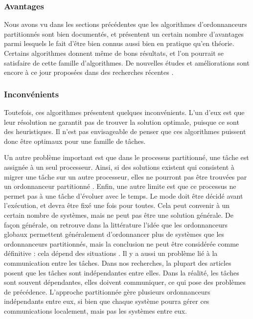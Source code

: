 \documentclass[11pt,a4paper,oneside]{report}
\begin{document}
\subsubsection{Avantages}
Nous avons vu dans les sections précédentes que les algorithmes d'ordonnanceurs 
partitionnés sont bien documentés, et présentent un certain nombre d'avantages parmi lesquels 
le fait d'être bien connus aussi bien en pratique qu'en théorie. 
Certains algorithmes donnent même de bons résultats, et l'on pourrait se satisfaire de 
cette famille d'algorithmes. De nouvelles études et améliorations sont encore à ce jour proposées 
dans des recherches récentes \cite{rodriguez_paul_multi-criteria_2013}.\\

\subsubsection{Inconvénients}
Toutefois, ces algorithmes présentent quelques inconvénients. 
L'un d'eux est que leur résolution ne garantit pas de trouver la solution optimale, 
puisque ce sont des heuristiques. 
Il n'est pas envisageable de penser 
que ces algorithmes puissent donc être optimaux pour une famille de tâches.

Un autre problème important est que dans le processus partitionné, une tâche est 
assignée à un seul processeur. 
Ainsi, si des solutions existent qui consistent à migrer une tâche sur un autre processeur, 
elles ne pourront pas être trouvées 
par un ordonnanceur partitionné \cite{ramamurthy_static-priority_2000}. 
Enfin, une autre limite est que ce processus ne permet pas à une tâche d'évoluer avec le temps. 
Le mode doit être décidé avant l'exécution, et devra être fixé une fois pour toutes. 
Cela peut convenir à un certain nombre de systèmes, mais ne peut pas être une solution générale.
De façon générale, on retrouve dans la littérature l'idée que les ordonnanceurs globaux 
permettent généralement d'ordonnancer plus de systèmes que les ordonnanceurs partitionnés, 
mais la conclusion ne peut être considérée comme définitive : cela dépend des situations
\cite{lopez_utilization_2004}.
Il y a aussi un problème lié à la communication entre les tâches. Dans nos recherches, 
la plupart des articles posent que les tâches sont indépendantes entre elles. Dans 
la réalité, les tâches sont souvent dépendantes, elles doivent communiquer, ce qui pose 
des problèmes de précédence. 
L'approche partitionnée gère plusieurs ordonnanceurs indépendants entre eux, si bien 
que chaque système pourra gérer ces communications localement, mais pas les systèmes entre eux. 
\\
\end{document}
